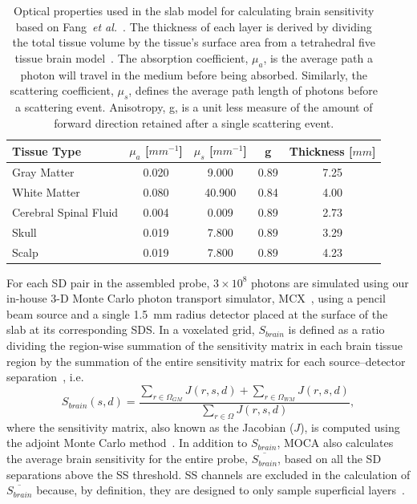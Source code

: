 \begin{table}[]
\centering
\caption{Optical properties used in the slab model for calculating brain sensitivity based on Fang~\emph{et al.}~\cite{Fang2010}. The thickness of each layer is derived by dividing the total tissue volume by the tissue's surface area from a tetrahedral five tissue brain model~\cite{Sanchez2012}. The absorption coefficient, $\mu_{a}$, is the average path a photon will travel in the medium before being absorbed. Similarly, the scattering coefficient, $\mu_{s}$, defines the average path length of photons before a scattering event. Anisotropy, g, is a unit less measure of the amount of forward direction retained after a single scattering event.}
\label{tab:opticalproperties}
\begin{tabular}{@{}lcccc@{}}
\toprule
Tissue Type  & $\mu_{a}$ [$mm^{-1}$] & $\mu_{s}$ [$mm^{-1}$] & g    & Thickness [$mm$] \\ \midrule
Gray Matter                     & 0.020      & 9.000      & 0.89 & 7.25           \\
White Matter                    & 0.080      & 40.900     & 0.84 & 4.00           \\
Cerebral Spinal Fluid           & 0.004      & 0.009      & 0.89 & 2.73           \\
Skull                           & 0.019      & 7.800      & 0.89 & 3.29           \\
Scalp                           & 0.019      & 7.800      & 0.89 & 4.23           \\ \bottomrule
\end{tabular}
\end{table}

For each SD pair in the assembled probe, $3\times10^{8}$ photons are simulated using our in-house 3-D Monte Carlo photon transport simulator, MCX~\cite{Fang2009}, using a pencil beam source and a single 1.5~mm radius detector placed at the surface of the slab at its corresponding SDS. In a voxelated grid, $S_{brain}$ is defined as a ratio dividing the region-wise summation of the sensitivity matrix in each brain tissue region by the summation of the entire sensitivity matrix for each source–detector separation~\cite{Brigadoi2015}, i.e.
\begin{equation}
\label{eq:fov}
S_{brain}(s,d) = \frac{\sum_{r\in\Omega_{GM}}J(r,s,d) + \sum_{r\in\Omega_{WM}}J(r,s,d)} {\sum_{r\in\Omega}J(r,s,d)},
\end{equation}
where the sensitivity matrix, also known as the Jacobian ($J$), is computed using the adjoint Monte Carlo method~\cite{Yao2018}. In addition to $S_{brain}$, MOCA also calculates the average brain sensitivity for the entire probe, $\overline{S_{brain}}$, based on all the SD separations above the SS threshold. SS channels are excluded in the calculation of $\overline{S_{brain}}$ because, by definition, they are designed to only sample superficial layers~\cite{Brigadoi2015}.

